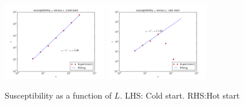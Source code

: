 \documentclass[12pt]{article}
\begin{document}
\begin{figure}[h!]
	\begin{center}
		\includegraphics[width=0.4\textwidth]{Cold_susceptability.png}
		\includegraphics[width=0.4\textwidth]{Hot_susceptability.png}
		\caption{Susceptibility as a function of $L$. LHS: Cold start. RHS:Hot start}
		\label{fig6}
	\end{center}
\end{figure}
\end{document}
